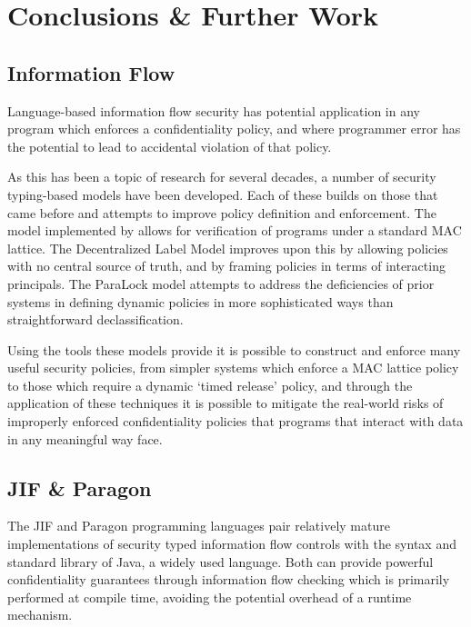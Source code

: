 \chapter{Conclusions \& Further Work} \label{chap_further_work}

\section{Information Flow}

Language-based information flow security has potential application in any program which enforces a confidentiality policy, and where programmer error has the potential to lead to accidental violation of that policy.

As this has been a topic of research for several decades, a number of security typing-based models have been developed. Each of these builds on those that came before and attempts to improve policy definition and enforcement. The model implemented by \citeauthor{denning1977certification} \cite{denning1977certification} allows for verification of programs under a standard MAC lattice. The Decentralized Label Model improves upon this by allowing policies with no central source of truth, and by framing policies in terms of interacting principals. The ParaLock model \cite{broberg2010paralocks} attempts to address the deficiencies of prior systems in defining dynamic policies in more sophisticated ways than straightforward declassification.

Using the tools these models provide it is possible to construct and enforce many useful security policies, from simpler systems which enforce a MAC lattice policy to those which require a dynamic `timed release' policy, and through the application of these techniques it is possible to mitigate the real-world risks of improperly enforced confidentiality policies that programs that interact with data in any meaningful way face.

\section{JIF \& Paragon}

The JIF and Paragon programming languages pair relatively mature implementations of security typed information flow controls with the syntax and standard library of Java, a widely used language. Both can provide powerful confidentiality guarantees through information flow checking which is primarily performed at compile time, avoiding the potential overhead of a runtime mechanism.

